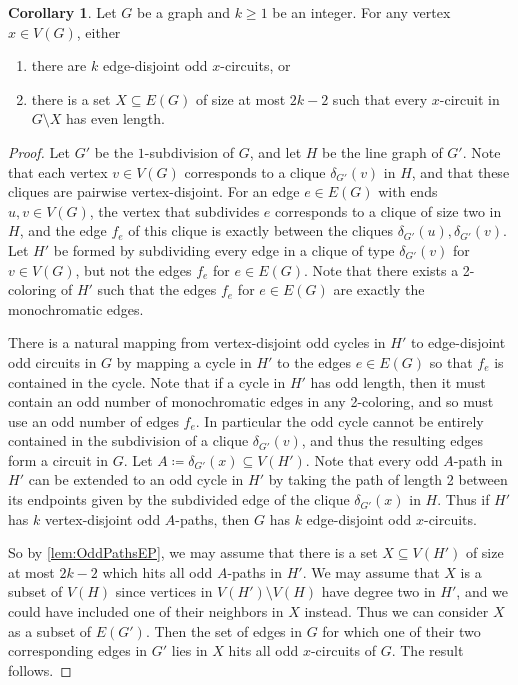 \documentclass{article}
\theoremstyle{definition}
\newtheorem{corollary}[environment]{Corollary}
\begin{document}
\begin{corollary}\label{cor:OddCircuitsEP}
    Let $G$ be a graph and $k \geq 1$ be an integer. For any vertex $x \in V(G)$, either
    \begin{enumerate}
        \item there are $k$ edge-disjoint odd $x$-circuits, or
        \item there is a set $X \subseteq E(G)$ of size at most $2k-2$ such that every $x$-circuit in $G \setminus X$ has even length.
    \end{enumerate}
\end{corollary}
\begin{proof}
    Let $G'$ be the $1$-subdivision of $G$, and let $H$ be the line graph of $G'$. Note that each vertex $v \in V(G)$ corresponds to a clique $\delta_{G'}(v)$ in $H$, and that these cliques are pairwise vertex-disjoint. For an edge $e \in E(G)$ with ends $u,v \in V(G)$, the vertex that subdivides $e$ corresponds to a clique of size two in $H$, and the edge $f_e$ of this clique is exactly between the cliques $\delta_{G'}(u), \delta_{G'}(v)$. Let $H'$ be formed by subdividing every edge in a clique of type $\delta_{G'}(v)$ for $v \in V(G)$, but not the edges $f_e$ for $e \in E(G)$. Note that there exists a 2-coloring of $H'$ such that the edges $f_e$ for $e \in E(G)$ are exactly the monochromatic edges.

    There is a natural mapping from vertex-disjoint odd cycles in $H'$ to edge-disjoint odd circuits in $G$ by mapping a cycle in $H'$ to the edges $e\in E(G)$ so that $f_e$ is contained in the cycle. Note that if a cycle in $H'$ has odd length, then it must contain an odd number of monochromatic edges in any 2-coloring, and so must use an odd number of edges $f_e$. In particular the odd cycle cannot be entirely contained in the subdivision of a clique $\delta_{G'}(v)$, and thus the resulting edges form a circuit in $G$. Let $A \coloneq \delta_{G'}(x) \subseteq V(H')$. Note that every odd $A$-path in $H'$ can be extended to an odd cycle in $H'$ by taking the path of length 2 between its endpoints given by the subdivided edge of the clique $\delta_{G'}(x)$ in $H$. Thus if $H'$ has $k$ vertex-disjoint odd $A$-paths, then $G$ has $k$ edge-disjoint odd $x$-circuits. 

    So by \cref{lem:OddPathsEP}, we may assume that there is a set $X \subseteq V(H')$ of size at most $2k-2$ which hits all odd $A$-paths in $H'$. We may assume that $X$ is a subset of $V(H)$ since vertices in $V(H')\setminus V(H)$ have degree two in $H'$, and we could have included one of their neighbors in $X$ instead. Thus we can consider $X$ as a subset of $E(G')$. Then the set of edges in $G$ for which one of their two corresponding edges in $G'$ lies in $X$ hits all odd $x$-circuits of $G$. The result follows.
\end{proof}
\end{document}
